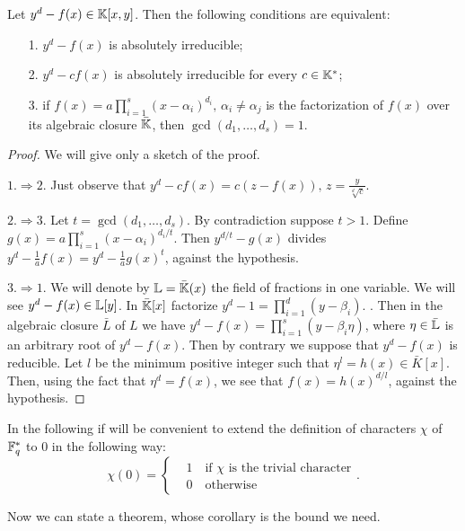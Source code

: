 \begin{lemma}\label{tre}
	Let $y^d-f(x)\in {\mathbb K}[x,y]$. Then the following conditions are equivalent:
	\begin{itemize}
	\item[1.] $y^d-f(x)$ is absolutely irreducible;
	\item[2.] $y^d-cf(x)$ is absolutely irreducible for every $c \in {\mathbb K}^{*}$;
	\item[3.] if $f(x)=a \prod_{i=1}^s (x-\alpha_i)^{d_i}, \, \alpha_i \neq \alpha_j$ is the factorization of $f(x)$ over
	 its algebraic closure $\bar{{\mathbb K}}$, then $\gcd(d_1,\dots ,d_s)=1$.
	\end{itemize}
\begin{proof} We will give only a sketch of the proof.

$1. \Rightarrow 2.$ Just observe that $y^d-cf(x)=c(z-f(x)),\, z=\frac{y}{\sqrt[d]{c}}$.

$2. \Rightarrow 3.$ Let $t=\gcd(d_1,\dots ,d_s)$. By contradiction suppose $t > 1$.
Define $g(x)=a \prod_{i=1}^s (x-\alpha_i)^{d_i/t}$. Then $y^{d/t}-g(x)$ divides $y^d-\frac{1}{a}f(x)=y^d-\frac{1}{a}g(x)^t$,
against the hypothesis.

$3. \Rightarrow 1.$ We will denote by ${\mathbb L}=\bar{{\mathbb K}}(x)$ the field of fractions in one variable.
We will see $y^d-f(x) \in {\mathbb L}[y]$.
In $\bar{{\mathbb K}}[x]$ factorize $y^d-1=\prod_{i=1}^d (y-\beta_i)$.  .
Then in the algebraic closure $\bar{L}$ of $L$ we have $y^d-f(x)=\prod_{i=1}^{s}(y-\beta_i \eta)$,
where $\eta \in \bar{{\mathbb L}}$ is an arbitrary root of $y^d-f(x)$.
Then by contrary we suppose that $y^d-f(x)$ is reducible. Let $l$ be the minimum positive integer such that
$\eta^l=h(x)\in \bar{K}[x]$. Then, using the fact that $\eta^d=f(x)$, we see that $f(x)=h(x)^{d/l}$, against the hypothesis. 
\end{proof}
\end{lemma}
In the following if will be  convenient to extend the definition of characters $\chi$ of ${\mathbb F}_q^{*}$
to 0 in the following way:
\begin{equation*}
	\chi (0)=\begin{cases}&1\quad \text{if $\chi$ is the trivial character}\\ &0 \quad\text{otherwise} \end{cases}.
\end{equation*}

Now we can state a theorem, whose corollary is the bound we need.

